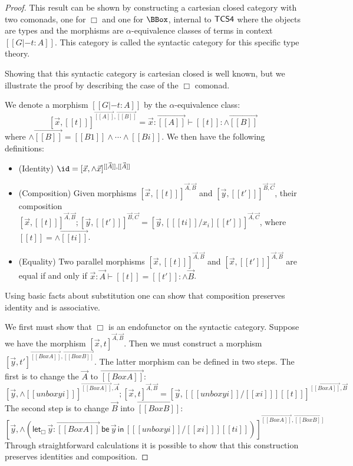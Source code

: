 \begin{proof}
  This result can be shown by constructing a cartesian closed category
  with two comonads, one for $\Box$ and one for $\BBox$, internal to
  $\sf{TCS4}$ where the objects are types and the morphisms are
  $\alpha$-equivalence classes of terms in context $[[G |- t : A]]$.
  This category is called the syntactic category for this specific type theory.

  Showing that this syntactic category is cartesian closed is well known, but we illustrate the proof by describing the case of the $\Box$
  comonad.

  We denote a morphism $[[G |- t : A]]$ by the $\alpha$-equivalence
  class:
  \[
  [\vec{x},[[t]] ]^{\vec{[[A]]},\vec{[[B]]}} = \vec{x}:\vec{[[A]]} \vdash [[t]] : \wedge\vec{[[B]]}
  \]
  where $\wedge\vec{[[B]]} = [[B1]] \wedge \cdots \wedge [[Bi]]$.  We
  then have the following definitions:
  \begin{itemize}
  \item (Identity) $\id = [\vec{x},\wedge\vec{x}]^{\vec{[[A]]},\vec{[[A]]}}$
  \item (Composition) Given morphisms $[\vec{x},[[t]] ]^{\vec{A},\vec{B}}$ and
    $[\vec{y},[[t']] ]^{\vec{B},\vec{C}}$, their composition
    $[\vec{x},[[t]] ]^{\vec{A},\vec{B}};[\vec{y},[[t']] ]^{\vec{B},\vec{C}} =
    [\vec{y},[ [[ti]] / x_i ] [[t']] ]^{\vec{A},\vec{C}}$, where
    $[[t]] = \wedge\vec{[[ti]]}$.
  \item (Equality) Two parallel morphisms $[\vec{x},[[t]]
  ]^{\vec{A},\vec{B}}$ and $[\vec{x},[[t']] ]^{\vec{A},\vec{B}}$ are
    equal if and only if
    $\vec{x} : \vec{A} \vdash [[t]] = [[t']] : \wedge\vec{B}$.
  \end{itemize}
  Using basic facts about substitution one can show that composition
  preserves identity and is associative.

  We first must show that $\Box$ is an endofunctor on the syntactic
  category.  Suppose we have the morphism
  $[\vec{x},t]^{\vec{A},\vec{B}}$.  Then we must construct a morphism
  $[\vec{y},t']^{\overrightarrow{[[Box A]]},\overrightarrow{[[Box
          B]]}}$.  The latter morphism can be defined in two steps.
  The first is to change the $\vec{A}$ to $\overrightarrow{[[Box A]]}$:
  \[
    [ \vec{y},\wedge [[unbox yi]] ]^{\overrightarrow{[[Box A]]},\vec{A}};[\vec{x},t]^{\vec{A},\vec{B}}
    = [\vec{y}, [ [[unbox yi]]/[[xi]] ] [[t]] ]^{\overrightarrow{[[Box A]]},\vec{B}}
    \]
    The second step is to change $\vec{B}$ into $\overrightarrow{[[Box
          B]]}$:
    \[
      [\vec{y},\wedge (\mathsf{let}_\Box\,\vec{y}:\overrightarrow{[[Box A]]}\,\mathsf{be}\,\vec{y}\,\mathsf{in}\,[ [[unbox yi]]/[[xi]] ][[ti]])]^{\overrightarrow{[[Box A]]},\overrightarrow{[[Box B]]}}
      \]
  Through straightforward calculations it is possible to show that
  this construction preserves identities and composition.


\end{proof}
